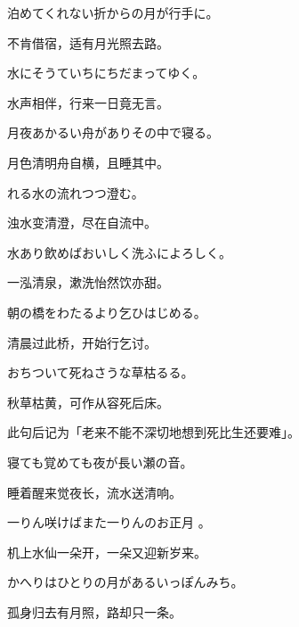 \begin{haiku}
    {\FH 泊めてくれない折からの月が行手に。}

    {\FK 不肯借宿，适有月光照去路。}
\end{haiku}

\begin{haiku}
    {\FH 水にそうていちにちだまってゆく。}

    {\FK 水声相伴，行来一日竟无言。}
\end{haiku}

\begin{haiku}
    {\FH 月夜あかるい舟がありその中で寝る。}

    {\FK 月色清明舟自横，且睡其中。}
\end{haiku}

\begin{haiku}
    {\FH {}れる水の流れつつ澄む。}

    {\FK 浊水变清澄，尽在自流中。}
\end{haiku}

\begin{haiku}
    {\FH 水あり飲めばおいしく洗ふによろしく。}

    {\FK 一泓清泉，漱洗怡然饮亦甜。}
\end{haiku}

\begin{haiku}
    {\FH 朝の橋をわたるより乞ひはじめる。}

    {\FK 清晨过此桥，开始行乞讨。}
\end{haiku}

\begin{haiku}
    {\FH おちついて死ねさうな草枯るる。}

    {\FK 秋草枯黄，可作从容死后床。}

    {\FS 此句后记为「老来不能不深切地想到死比生还要难」。}
\end{haiku}

\begin{haiku}
    {\FH 寝ても覚めても夜が長い瀬の音。}

    {\FK 睡着醒来觉夜长，流水送清响。}
\end{haiku}

\begin{haiku}
    {\FH 一りん咲けばまた一りんのお正月 。}

    {\FK 机上水仙一朵开，一朵又迎新岁来。}
\end{haiku}

\begin{haiku}
    {\FH かへりはひとりの月があるいっぽんみち。}

    {\FK 孤身归去有月照，路却只一条。}
\end{haiku}


